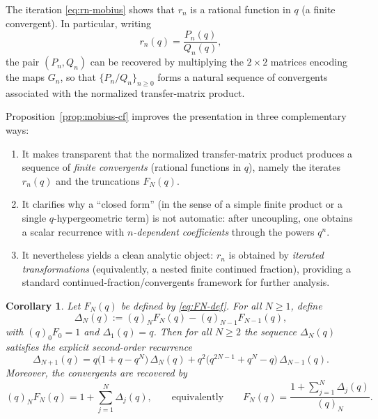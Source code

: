 \documentclass[letterpaper,12pt]{article}
\newtheorem{corollary}{Corollary}
\begin{document}
The iteration \eqref{eq:rn-mobius} shows that $r_n$ is a rational function in $q$ (a finite
convergent). In particular, writing
\[
r_n(q)=\frac{P_n(q)}{Q_n(q)},
\]
the pair $(P_n,Q_n)$ can be recovered by multiplying the $2\times 2$ matrices encoding
the   maps $G_n$, so that $\{P_n/Q_n\}_{n\ge 0}$ forms a natural sequence of convergents
associated with the normalized transfer-matrix product.

Proposition~\ref{prop:mobius-cf} improves the presentation in three complementary ways:
\begin{enumerate}
\item It makes transparent that the normalized transfer-matrix product produces a sequence of
\emph{finite convergents} (rational functions in $q$), namely the iterates $r_n(q)$ and the truncations
$F_N(q)$.
\item It clarifies why a ``closed form'' (in the sense of a simple finite product or a single
$q$-hypergeometric term) is not automatic: after uncoupling, one obtains a scalar recurrence with
\emph{$n$-dependent coefficients} through the powers $q^n$.
\item It nevertheless yields a clean analytic object: $r_n$ is obtained by \emph{iterated  
transformations} (equivalently, a nested finite continued fraction), providing a standard
continued-fraction/convergents framework for further analysis.
\end{enumerate}

\begin{corollary}\label{cor:FN-delta}
Let $F_N(q)$ be defined by \eqref{eq:FN-def}. For all $N\geq 1$, define
\begin{equation}
    \Delta_N(q):=(q)_N F_N(q)-(q)_{N-1}F_{N-1}(q),
\end{equation}
with $(q)_0F_0=1$ and $\Delta_1(q)=q$.
Then for all $N\ge 2$ the sequence $\Delta_N(q)$ satisfies the explicit second-order recurrence
\begin{equation}\label{eq:delta-second}
\Delta_{N+1}(q)
= q\bigl(1+q-q^{N}\bigr)\,\Delta_{N}(q)
+ q^2\bigl(q^{2N-1}+q^{N}-q\bigr)\,\Delta_{N-1}(q).
\end{equation}
Moreover, the convergents are recovered by
\begin{equation}\label{eq:FN-from-delta}
(q)_N F_N(q)=1+\sum_{j=1}^N \Delta_j(q),
\qquad\text{equivalently}\qquad
F_N(q)=\frac{1+\sum_{j=1}^N \Delta_j(q)}{(q)_N}.
\end{equation}
\end{corollary}
\end{document}
